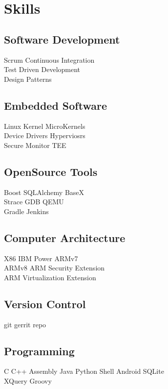 \documentclass[a4paper]{deedy-resume} %
\begin{document}
\begin{minipage}[t]{0.33\textwidth} %

\section{Skills}

\subsection{Software Development}
Scrum \textbullet{} Continuous Integration \textbullet{} \\
Test Driven Development \textbullet{} \\
Design Patterns

\subsection{Embedded Software}
Linux Kernel \textbullet{} MicroKernels \textbullet{} \\
Device Drivers \textbullet{} Hyperviosrs \textbullet{} \\
Secure Monitor \textbullet{} TEE

\subsection{OpenSource Tools}
Boost \textbullet SQLAlchemy \textbullet BaseX \textbullet{} \\
Strace \textbullet GDB \textbullet{} QEMU \textbullet{} \\
Gradle \textbullet{} Jenkins

\subsection{Computer Architecture}
X86 \textbullet{} IBM Power \textbullet{} ARMv7 \textbullet{} \\
ARMv8 \textbullet{} ARM Security Extension \textbullet{} \\
ARM Virtualization Extension \\

\subsection{Version Control}
git \textbullet{} gerrit \textbullet{} repo

\subsection{Programming}
C \textbullet{} C++ \textbullet{} Assembly \textbullet{} Java \textbullet{} Python
Shell \textbullet{} Android \textbullet{} SQLite \textbullet \\
XQuery \textbullet{} Groovy


\end{minipage}
\end{document}
